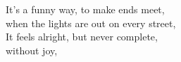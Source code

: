 It's a funny way, to make ends meet, \\
when the lights are out on every street, \\
It feels alright, but never complete, \\
without joy,